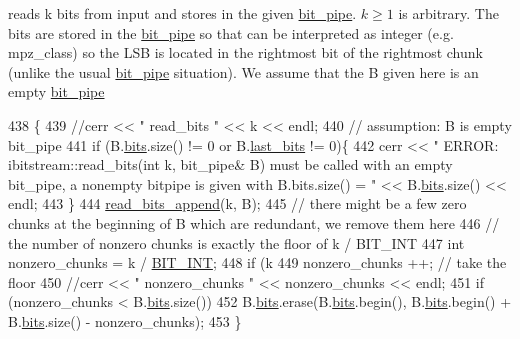 reads k bits from input and stores in the given \hyperlink{classbit__pipe}{bit\+\_\+pipe}. $k \geq 1$ is arbitrary. The bits are stored in the \hyperlink{classbit__pipe}{bit\+\_\+pipe} so that can be interpreted as integer (e.\+g. mpz\+\_\+class) so the L\+SB is located in the rightmost bit of the rightmost chunk (unlike the usual \hyperlink{classbit__pipe}{bit\+\_\+pipe} situation). We assume that the B given here is an empty \hyperlink{classbit__pipe}{bit\+\_\+pipe} 


\begin{DoxyCode}
438                                             \{
439   \textcolor{comment}{//cerr << " read\_bits " << k << endl;}
440   \textcolor{comment}{// assumption: B is empty bit\_pipe}
441   \textcolor{keywordflow}{if} (B.\hyperlink{classbit__pipe_a86f38af1e9736b053728033490476b50}{bits}.size() != 0 or B.\hyperlink{classbit__pipe_a0f3e84b02751803adaab499b5dad86fe}{last\_bits} != 0)\{
442     cerr << \textcolor{stringliteral}{" ERROR: ibitstream::read\_bits(int k, bit\_pipe& B) must be called with an empty bit\_pipe, a
       nonempty bitpipe is given with B.bits.size() = "} << B.\hyperlink{classbit__pipe_a86f38af1e9736b053728033490476b50}{bits}.size() << endl;
443   \}
444   \hyperlink{classibitstream_acec2e9efa21551ce8db784f5b0bbd1b5}{read\_bits\_append}(k, B);
445   \textcolor{comment}{// there might be a few zero chunks at the beginning of B which are redundant, we remove them here}
446   \textcolor{comment}{// the number of nonzero chunks is exactly the floor of k / BIT\_INT}
447   \textcolor{keywordtype}{int} nonzero\_chunks = k / \hyperlink{bitstream_8h_afcadf5aa65c5159bfb96c4d82ebc0a5d}{BIT\_INT};
448   \textcolor{keywordflow}{if} (k %
449     nonzero\_chunks ++; \textcolor{comment}{// take the floor}
450   \textcolor{comment}{//cerr << " nonzero\_chunks " << nonzero\_chunks << endl;}
451   \textcolor{keywordflow}{if} (nonzero\_chunks < B.\hyperlink{classbit__pipe_a86f38af1e9736b053728033490476b50}{bits}.size())
452     B.\hyperlink{classbit__pipe_a86f38af1e9736b053728033490476b50}{bits}.erase(B.\hyperlink{classbit__pipe_a86f38af1e9736b053728033490476b50}{bits}.begin(), B.\hyperlink{classbit__pipe_a86f38af1e9736b053728033490476b50}{bits}.begin() + B.\hyperlink{classbit__pipe_a86f38af1e9736b053728033490476b50}{bits}.size() - nonzero\_chunks);
453 \}
\end{DoxyCode}
\mbox{\label{classibitstream_acec2e9efa21551ce8db784f5b0bbd1b5}} 
